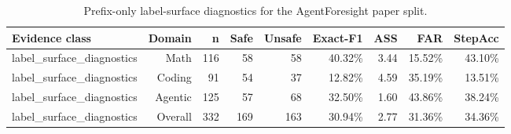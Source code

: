 \begin{table}[t]
\centering
\caption{Prefix-only label-surface diagnostics for the AgentForesight paper split.}
\label{tab:agentforesight-prefix}
\begin{tabular}{lrrrrrrrr}
\toprule
Evidence class & Domain & n & Safe & Unsafe & Exact-F1 & ASS & FAR & StepAcc \\
\midrule
label\_surface\_diagnostics & Math & 116 & 58 & 58 & 40.32\% & 3.44 & 15.52\% & 43.10\% \\
label\_surface\_diagnostics & Coding & 91 & 54 & 37 & 12.82\% & 4.59 & 35.19\% & 13.51\% \\
label\_surface\_diagnostics & Agentic & 125 & 57 & 68 & 32.50\% & 1.60 & 43.86\% & 38.24\% \\
label\_surface\_diagnostics & Overall & 332 & 169 & 163 & 30.94\% & 2.77 & 31.36\% & 34.36\% \\
\bottomrule
\end{tabular}
\end{table}
